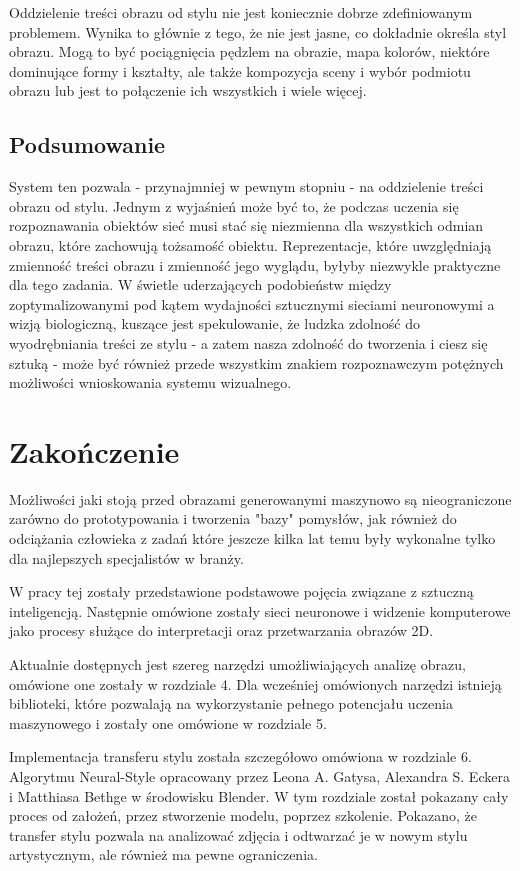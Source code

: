 \documentclass[brudnopis]{xmgr}
\begin{document}
Oddzielenie treści obrazu od stylu nie jest koniecznie dobrze zdefiniowanym problemem. Wynika to głównie z tego, że nie jest jasne, co dokładnie określa styl obrazu. Mogą to być pociągnięcia pędzlem na obrazie, mapa kolorów, niektóre dominujące formy i kształty, ale także kompozycja sceny i wybór podmiotu obrazu lub jest to połączenie ich wszystkich i wiele więcej. 

\section{Podsumowanie\label{s:dsssl}}

System ten pozwala - przynajmniej w pewnym stopniu - na oddzielenie treści obrazu od stylu. Jednym z wyjaśnień może być to, że podczas uczenia się rozpoznawania obiektów sieć musi stać się niezmienna dla wszystkich odmian obrazu, które zachowują tożsamość obiektu. Reprezentacje, które uwzględniają zmienność treści obrazu i zmienność jego wyglądu, byłyby niezwykle praktyczne dla tego zadania. W świetle uderzających podobieństw między zoptymalizowanymi pod kątem wydajności sztucznymi sieciami neuronowymi a wizją biologiczną, kuszące jest spekulowanie, że ludzka zdolność do wyodrębniania treści ze stylu - a zatem nasza zdolność do tworzenia i ciesz się sztuką - może być również przede wszystkim znakiem rozpoznawczym potężnych możliwości wnioskowania systemu wizualnego.


\chapter{Zakończenie}
Możliwości jaki stoją przed obrazami generowanymi maszynowo są nieograniczone zarówno do prototypowania i tworzenia "bazy" pomysłów, jak również do odciążania człowieka z zadań które jeszcze kilka lat temu były wykonalne tylko dla najlepszych specjalistów w branży.

W pracy tej zostały przedstawione podstawowe pojęcia związane z sztuczną inteligencją. Następnie omówione zostały sieci neuronowe i widzenie komputerowe jako procesy służące do interpretacji oraz przetwarzania obrazów 2D. 

Aktualnie dostępnych jest szereg narzędzi umożliwiających analizę obrazu, omówione one zostały w rozdziale 4. Dla wcześniej omówionych narzędzi istnieją biblioteki, które pozwalają na wykorzystanie pełnego potencjału uczenia maszynowego i zostały one omówione w rozdziale 5.

Implementacja transferu stylu została szczegółowo omówiona w rozdziale 6. Algorytmu Neural-Style opracowany przez Leona A. Gatysa, Alexandra S. Eckera i Matthiasa Bethge w środowisku Blender. W tym rozdziale został pokazany cały proces od założeń, przez stworzenie modelu, poprzez szkolenie. Pokazano, że transfer stylu pozwala na analizować zdjęcia i odtwarzać je w nowym stylu artystycznym, ale również ma pewne ograniczenia. 
\end{document}
